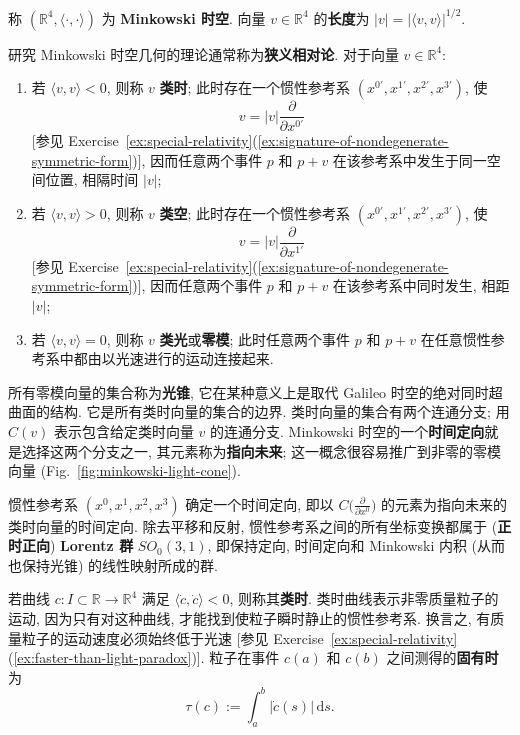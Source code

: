 \begin{RiemannDefinition}\label{def:minkowski-spacetime}
称 $(\mathbb{R}^4,\langle\cdot,\cdot\rangle)$ 为 \textbf{Minkowski 时空}. 向量 $v\in\mathbb{R}^4$ 的\textbf{长度}为 $|v|=|\langle v,v\rangle|^{1/2}$.
\end{RiemannDefinition}

研究 Minkowski 时空几何的理论通常称为\textbf{狭义相对论}. 对于向量 $v\in\mathbb{R}^4$:
\begin{enumerate}[label=(\arabic*),leftmargin=*]
\item 若 $\langle v,v\rangle<0$, 则称 $v$ \textbf{类时}; 此时存在一个惯性参考系 $(x^{0'},x^{1'},x^{2'},x^{3'})$, 使
\[
  v=|v|\frac{\partial}{\partial x^{0'}}
\]
[参见 Exercise~\ref{ex:special-relativity}(\ref{ex:signature-of-nondegenerate-symmetric-form})], 因而任意两个事件 $p$ 和 $p+v$ 在该参考系中发生于同一空间位置, 相隔时间 $|v|$;
\item 若 $\langle v,v\rangle>0$, 则称 $v$ \textbf{类空}; 此时存在一个惯性参考系 $(x^{0'},x^{1'},x^{2'},x^{3'})$, 使
\[
  v=|v|\frac{\partial}{\partial x^{1'}}
\]
[参见 Exercise~\ref{ex:special-relativity}(\ref{ex:signature-of-nondegenerate-symmetric-form})], 因而任意两个事件 $p$ 和 $p+v$ 在该参考系中同时发生, 相距 $|v|$;
\item 若 $\langle v,v\rangle=0$, 则称 $v$ \textbf{类光}或\textbf{零模}; 此时任意两个事件 $p$ 和 $p+v$ 在任意惯性参考系中都由以光速进行的运动连接起来.
\end{enumerate}

所有零模向量的集合称为\textbf{光锥}, 它在某种意义上是取代 Galileo 时空的绝对同时超曲面的结构. 它是所有类时向量的集合的边界. 类时向量的集合有两个连通分支; 用 $C(v)$ 表示包含给定类时向量 $v$ 的连通分支. Minkowski 时空的一个\textbf{时间定向}就是选择这两个分支之一, 其元素称为\textbf{指向未来}; 这一概念很容易推广到非零的零模向量 (Fig.~\ref{fig:minkowski-light-cone}).

惯性参考系 $(x^0,x^1,x^2,x^3)$ 确定一个时间定向, 即以 $C\bigl(\frac{\partial}{\partial x^0}\bigr)$ 的元素为指向未来的类时向量的时间定向. 除去平移和反射, 惯性参考系之间的所有坐标变换都属于 (\textbf{正时正向}) \textbf{Lorentz 群} $SO_0(3,1)$, 即保持定向, 时间定向和 Minkowski 内积 (从而也保持光锥) 的线性映射所成的群.\label{idx:orthochronous-transformations}

若曲线 $c:I\subset\mathbb{R}\to\mathbb{R}^4$ 满足 $\langle\dot c,\dot c\rangle<0$, 则称其\textbf{类时}. 类时曲线表示非零质量粒子的运动, 因为只有对这种曲线, 才能找到使粒子瞬时静止的惯性参考系. 换言之, 有质量粒子的运动速度必须始终低于光速 [参见 Exercise~\ref{ex:special-relativity}(\ref{ex:faster-than-light-paradox})]. 粒子在事件 $c(a)$ 和 $c(b)$ 之间测得的\textbf{固有时}为
\[
  \tau(c):=\int_a^b|\dot c(s)|\,\mathrm{d}s.
\]

